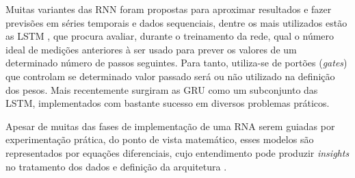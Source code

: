Muitas variantes das RNN foram propostas para aproximar resultados e fazer previsões em séries temporais e dados sequenciais, dentre os mais utilizados estão as LSTM \cite{Hochreiter1997}, que procura avaliar, durante o treinamento da rede, qual o número ideal de medições anteriores à ser usado para prever os valores de um determinado número de passos seguintes. Para tanto, utiliza-se de portões (\emph{gates}) que controlam se determinado valor passado será ou não utilizado na definição dos pesos. Mais recentemente surgiram as GRU \cite{Cho2014} como um subconjunto das LSTM, implementados com bastante sucesso em diversos problemas práticos.

Apesar de muitas das fases de implementação de uma RNA serem guiadas por experimentação prática, do ponto de vista matemático, esses modelos são representados por equações diferenciais, cujo entendimento pode produzir \emph{insights} no tratamento dos dados e definição da arquitetura \cite{Sherstinsky2020}.
